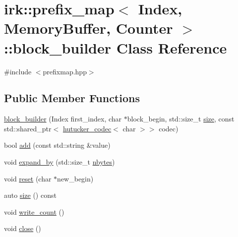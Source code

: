 \hypertarget{classirk_1_1prefix__map_1_1block__builder}{}\section{irk\+:\+:prefix\+\_\+map$<$ Index, Memory\+Buffer, Counter $>$\+:\+:block\+\_\+builder Class Reference}
\label{classirk_1_1prefix__map_1_1block__builder}


{\ttfamily \#include $<$prefixmap.\+hpp$>$}

\subsection*{Public Member Functions}
\begin{DoxyCompactItemize}
\item 
\mbox{\hyperlink{classirk_1_1prefix__map_1_1block__builder_af6ed7104994775956eb88348b87c46d8}{block\+\_\+builder}} (Index first\+\_\+index, char $\ast$block\+\_\+begin, std\+::size\+\_\+t \mbox{\hyperlink{classirk_1_1prefix__map_1_1block__builder_ac3fb0a31f627e1f49b9eb0738742dd23}{size}}, const std\+::shared\+\_\+ptr$<$ \mbox{\hyperlink{classirk_1_1hutucker__codec}{hutucker\+\_\+codec}}$<$ char $>$$>$ codec)
\item 
bool \mbox{\hyperlink{classirk_1_1prefix__map_1_1block__builder_a7624581bf15668f0be6733f8105d4c59}{add}} (const std\+::string \&value)
\item 
void \mbox{\hyperlink{classirk_1_1prefix__map_1_1block__builder_a86b281aeb689345c5cac4b3a9266d3a6}{expand\+\_\+by}} (std\+::size\+\_\+t \mbox{\hyperlink{namespaceirk_a655971fe9a3706528f14c395f938d416}{nbytes}})
\item 
void \mbox{\hyperlink{classirk_1_1prefix__map_1_1block__builder_aa25610a99626d90e1b3232fc05fe58cb}{reset}} (char $\ast$new\+\_\+begin)
\item 
auto \mbox{\hyperlink{classirk_1_1prefix__map_1_1block__builder_ac3fb0a31f627e1f49b9eb0738742dd23}{size}} () const
\item 
void \mbox{\hyperlink{classirk_1_1prefix__map_1_1block__builder_acd19257e8bac2d4af07431383c1c2c16}{write\+\_\+count}} ()
\item 
void \mbox{\hyperlink{classirk_1_1prefix__map_1_1block__builder_ac2b76fd0236effde8936f1d710b29aed}{close}} ()
\end{DoxyCompactItemize}



